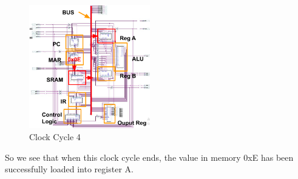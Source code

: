 \begin{figure}[th]
	\includegraphics[width=0.47\textwidth]{figures/cc4}
	\centering
	\caption{Clock Cycle 4}
	\label{fig:cc4}
\end{figure}

So we see that when this clock cycle ends, the value in memory 0xE has been successfully loaded into register A.
